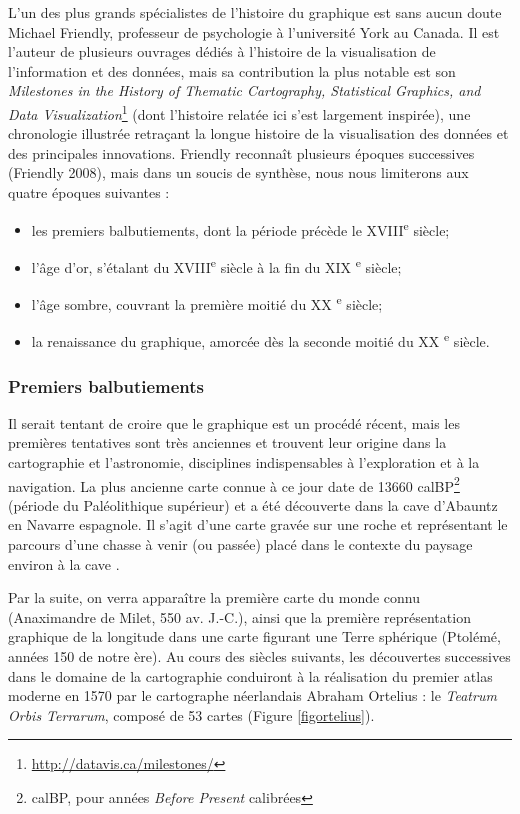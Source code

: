 \documentclass[]{article}
\providecommand{\tightlist}{%
  \setlength{\itemsep}{0pt}\setlength{\parskip}{0pt}}
\begin{document}
L'un des plus grands spécialistes de l'histoire du graphique est sans aucun doute Michael Friendly, professeur de psychologie à l'université York au Canada. Il est l'auteur de plusieurs ouvrages dédiés à l'histoire de la visualisation de l'information et des données, mais sa contribution la plus notable est son \emph{Milestones in the History of Thematic Cartography, Statistical Graphics, and Data Visualization}\footnote{\url{http://datavis.ca/milestones/}} (dont l'histoire relatée ici s'est largement inspirée), une chronologie illustrée retraçant la longue histoire de la visualisation des données et des principales innovations. Friendly reconnaît plusieurs époques successives (Friendly 2008), mais dans un soucis de synthèse, nous nous limiterons aux quatre époques suivantes :

\begin{itemize}
\tightlist
\item
  les premiers balbutiements, dont la période précède le XVIII\textsuperscript{e} siècle;
\item
  l'âge d'or, s'étalant du XVIII\textsuperscript{e} siècle à la fin du XIX \textsuperscript{e} siècle;
\item
  l'âge sombre, couvrant la première moitié du XX \textsuperscript{e} siècle;
\item
  la renaissance du graphique, amorcée dès la seconde moitié du XX \textsuperscript{e} siècle.
\end{itemize}

\hypertarget{premiers-balbutiements}{%
\subsubsection{Premiers balbutiements}\label{premiers-balbutiements}}

Il serait tentant de croire que le graphique est un procédé récent, mais les premières tentatives sont très anciennes et trouvent leur origine dans la cartographie et l'astronomie, disciplines indispensables à l'exploration et à la navigation. La plus ancienne carte connue à ce jour date de 13660 calBP\footnote{calBP, pour années \emph{Before Present} calibrées} (période du Paléolithique supérieur) et a été découverte dans la cave d'Abauntz en Navarre espagnole. Il s'agit d'une carte gravée sur une roche et représentant le parcours d'une chasse à venir (ou passée) placé dans le contexte du paysage environ à la cave \citep{Utrilla2009}.

Par la suite, on verra apparaître la première carte du monde connu (Anaximandre de Milet, 550 av. J.-C.), ainsi que la première représentation graphique de la longitude dans une carte figurant une Terre sphérique (Ptolémé, années 150 de notre ère). Au cours des siècles suivants, les découvertes successives dans le domaine de la cartographie conduiront à la réalisation du premier atlas moderne en 1570 par le cartographe néerlandais Abraham Ortelius : le \emph{Teatrum Orbis Terrarum}, composé de 53 cartes (Figure \ref{figortelius}).
\end{document}
